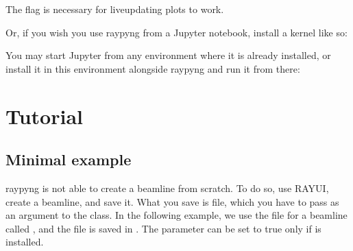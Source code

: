 \documentclass[letterpaper,10pt,english]{sphinxmanual}
\begin{document}
\begin{itemize}
\begin{sphinxVerbatim}[commandchars=\\\{\}]
 
\end{sphinxVerbatim}

\sphinxAtStartPar
The flag  is necessary for live\sphinxhyphen{}updating plots to work.

\sphinxAtStartPar
Or, if you wish you use raypyng from a Jupyter notebook, install a kernel like
so:

\begin{sphinxVerbatim}[commandchars=\\\{\}]
      
\end{sphinxVerbatim}

\sphinxAtStartPar
You may start Jupyter from any environment where it is already installed, or
install it in this environment alongside raypyng and run it from there:

\begin{sphinxVerbatim}[commandchars=\\\{\}]
  
 
\end{sphinxVerbatim}

\end{itemize}

\sphinxstepscope


\chapter{Tutorial}
\label{\detokenize{tutorial:tutorial}}\label{\detokenize{tutorial::doc}}

\section{Minimal example}
\label{\detokenize{tutorial:minimal-example}}
\sphinxAtStartPar
raypyng is not able to create a beamline from scratch. To do so, use RAY\sphinxhyphen{}UI,
create a beamline, and save it. What you save is  file, which you have to
pass as an argument to the  class. In the following example, we
use the file for a beamline called , and the file is saved in .
The  parameter can be set to true only if  is installed.
\end{document}
